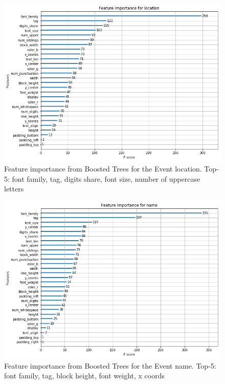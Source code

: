 \begin{figure}[h]
\begin{center}
\includegraphics[width=1.0\textwidth]{figures/importanceLocationboost}
\caption{Feature importance from Boosted Trees for the Event location. Top-5: font family, tag, digits share, font size, number of uppercase letters}
\label{fig:importanceName}
\end{center}
\end{figure}

\begin{figure}[h]
\begin{center}
\includegraphics[width=1.0\textwidth]{figures/importanceNameboost}
\caption{Feature importance from Boosted Trees for the Event name. Top-5: font family, tag, block height, font weight, x coords}
\label{fig:importanceName}
\end{center}
\end{figure}


